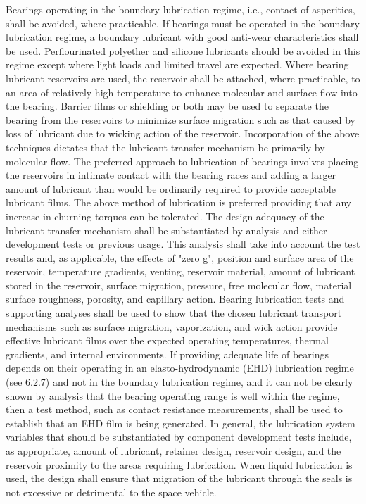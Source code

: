\documentclass[12pt]{article}
\begin{document}
Bearings operating in the boundary lubrication regime, i.e., contact of asperities, shall be avoided, where practicable. 
If bearings must be operated in the boundary lubrication regime, a boundary lubricant with good anti-wear characteristics shall be used. 
Perflourinated polyether and silicone lubricants should be avoided in this regime except where light loads and limited travel are expected. 
Where bearing lubricant reservoirs are used, the reservoir shall be attached, where practicable, to an area of relatively high temperature to enhance molecular and surface flow into the bearing. 
Barrier films or shielding or both may be used to separate the bearing from the reservoirs to minimize surface migration such as that caused by loss of lubricant due to wicking action of the reservoir. 
Incorporation of the above techniques dictates that the lubricant transfer mechanism be primarily by molecular flow. 
The preferred approach to lubrication of bearings involves placing the reservoirs in intimate contact with the bearing races and adding a larger amount of lubricant than would be ordinarily required to provide acceptable lubricant films. 
The above method of lubrication is preferred providing that any increase in churning torques can be tolerated. 
The design adequacy of the lubricant transfer mechanism shall be substantiated by analysis and either development tests or previous usage. 
This analysis shall take into account the test results and, as applicable, the effects of "zero g", position and surface area of the reservoir, temperature gradients, venting, reservoir material, amount of lubricant stored in the reservoir, surface migration, pressure, free molecular flow, material surface roughness, porosity, and capillary action. 
Bearing lubrication tests and supporting analyses shall be used to show that the chosen lubricant transport mechanisms such as surface migration, vaporization, and wick action provide effective lubricant films over the expected operating temperatures, thermal gradients, and internal environments. 
If providing adequate life of bearings depends on their operating in an elasto-hydrodynamic (EHD) lubrication regime (see 6.2.7) and not in the boundary lubrication regime, and it can not be clearly shown by analysis that the bearing operating range is well within the regime, then a test method, such as contact resistance measurements, shall be used to establish that an EHD film is being generated. 
In general, the lubrication system variables that should be substantiated by component development tests include, as appropriate, amount of lubricant, retainer design, reservoir design, and the reservoir proximity to the areas requiring lubrication. 
When liquid lubrication is used, the design shall ensure that migration of the lubricant through the seals is not excessive or detrimental to the space vehicle.
\end{document}
